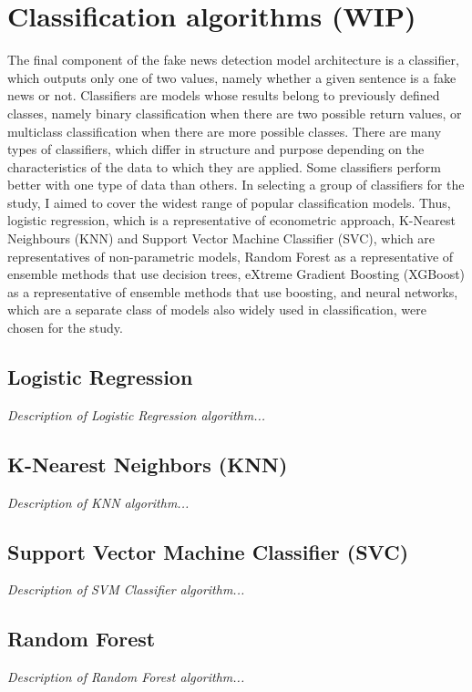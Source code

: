 \section{Classification algorithms (WIP)}
The final component of the fake news detection model architecture is a classifier, which outputs only one of two values, namely whether a given sentence is a fake news or not. Classifiers are models whose results belong to previously defined classes, namely binary classification when there are two possible return values, or multiclass classification when there are more possible classes. There are many types of classifiers, which differ in structure and purpose depending on the characteristics of the data to which they are applied. Some classifiers perform better with one type of data than others. In selecting a group of classifiers for the study, I aimed to cover the widest range of popular classification models. Thus, logistic regression, which is a representative of econometric approach, K-Nearest Neighbours (KNN) and Support Vector Machine Classifier (SVC), which are representatives of non-parametric models, Random Forest as a representative of ensemble methods that use decision trees, eXtreme Gradient Boosting (XGBoost) as a representative of ensemble methods that use boosting, and neural networks, which are a separate class of models also widely used in classification, were chosen for the study.

\subsection{Logistic Regression}
\textit{Description of Logistic Regression algorithm...}

\subsection{K-Nearest Neighbors (KNN)}
\textit{Description of KNN algorithm...}

\subsection{Support Vector Machine Classifier (SVC)}
\textit{Description of SVM Classifier algorithm...}

\subsection{Random Forest}
\textit{Description of Random Forest algorithm...}

